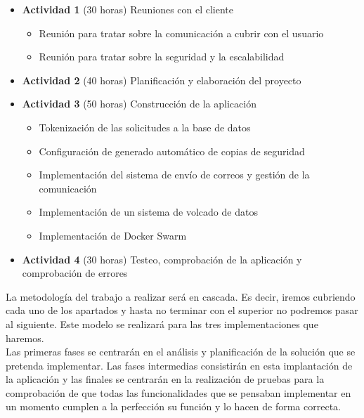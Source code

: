 \begin{itemize}
    \item \textbf{Actividad 1} (30 horas) Reuniones con el cliente
          \begin{itemize}
              \item Reunión para tratar sobre la comunicación a cubrir con el usuario
              \item Reunión para tratar sobre la seguridad y la escalabilidad
          \end{itemize}
    \item \textbf{Actividad 2} (40 horas) Planificación y elaboración del proyecto
    \item \textbf{Actividad 3} (50 horas) Construcción de la aplicación
          \begin{itemize}
              \item Tokenización de las solicitudes a la base de datos
              \item Configuración de generado automático de copias de seguridad
              \item Implementación del sistema de envío de correos y gestión de la comunicación
              \item Implementación de un sistema de volcado de datos
              \item Implementación de Docker Swarm
          \end{itemize}
    \item \textbf{Actividad 4} (30 horas) Testeo, comprobación de la aplicación y comprobación de errores
\end{itemize}

La metodología del trabajo a realizar será en cascada. Es decir, iremos cubriendo cada uno de los apartados y hasta no terminar con el superior no podremos pasar al siguiente. Este modelo se realizará para las tres implementaciones que haremos.
\\Las primeras fases se centrarán en el análisis y planificación de la solución que se pretenda implementar. Las fases intermedias consistirán en esta implantación de la aplicación y las finales se centrarán en la realización de pruebas para la comprobación de que todas las funcionalidades que se pensaban implementar en un momento cumplen a la perfección su función y lo hacen de forma correcta.